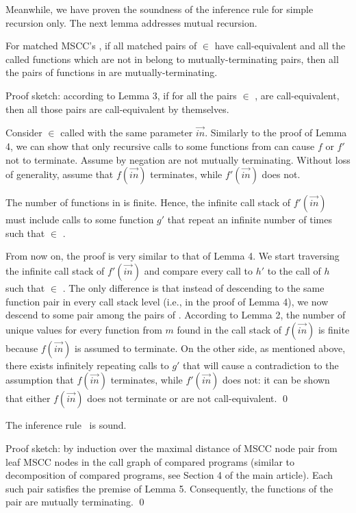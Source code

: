 \documentclass{llncs}
\begin{document}
Meanwhile, we have proven the soundness of the inference rule for simple recursion only. The next lemma addresses mutual recursion. 

\begin{lemma}For matched MSCC's , if all matched pairs of  $\in$  have call-equivalent  and all the called functions which are not in  belong to mutually-terminating pairs, then all the pairs of functions in  are mutually-terminating. 
\end{lemma}
Proof sketch: according to Lemma 3, if for all the pairs  $\in$ ,    are call-equivalent, then all those pairs are call-equivalent by themselves. 

Consider $\in$  called with the same parameter $\vec{in}$. Similarly to the proof of Lemma 4, we can show that only recursive calls to some functions from  can cause $f$ or $f'$ not to terminate. Assume by negation  are not mutually terminating. Without loss of generality, assume that $f(\vec{in})$ terminates, while $f'(\vec{in})$ does not.

The number of functions in  is finite. Hence, the infinite call stack of $f'(\vec{in})$ must include calls to some function $g'$ that repeat an infinite number of times such that  $\in$ .

From now on, the proof is very similar to that of Lemma 4. We start traversing the infinite call stack of $f'(\vec{in})$ and compare every call to $h'$ to the call of $h$ such that  $\in$ . The only difference is that instead of descending to the same function pair in every call stack level (i.e.,  in the proof of Lemma 4), we now descend to some pair among the pairs of . According to Lemma 2, the number of unique values for every function from $m$ found in the call stack of $f(\vec{in})$ is finite because $f(\vec{in})$ is assumed to terminate. On the other side, as mentioned above, there exists infinitely repeating calls to $g'$ that will cause a contradiction to the assumption that $f(\vec{in})$ terminates, while $f'(\vec{in})$ does not: it can be shown that either $f(\vec{in})$ does not terminate or  are not call-equivalent. \qed

\begin{theorem}
The inference rule\mbox{\ \mtermd} is sound.
\end{theorem}
Proof sketch: by induction over the maximal distance of MSCC node pair from leaf MSCC nodes in the call graph of compared programs (similar to decomposition of compared programs, see Section 4 of the main article). Each such pair satisfies the premise of Lemma 5. Consequently, the functions of the pair are mutually terminating. \qed
\end{document}

